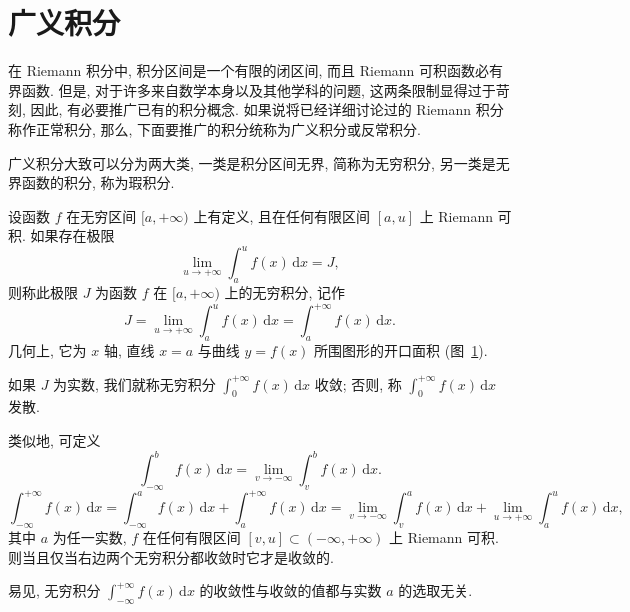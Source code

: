 \section{广义积分}\label{sec:6.5}

在 Riemann 积分中, 积分区间是一个有限的闭区间, 而且 Riemann 可积函数必有界函数. 但是, 对于许多来自数学本身以及其他学科的问题, 这两条限制显得过于苛刻, 因此, 有必要推广已有的积分概念. 如果说将已经详细讨论过的 Riemann 积分称作正常积分, 那么, 下面要推广的积分统称为广义积分或反常积分.

广义积分大致可以分为两大类, 一类是积分区间无界, 简称为无穷积分, 另一类是无界函数的积分, 称为瑕积分.

\begin{definition}\label{def:6.5.1}
设函数 $f$ 在无穷区间 $[a,+\infty)$ 上有定义, 且在任何有限区间 $[a,u]$ 上 Riemann 可积. 如果存在极限
\[
\lim_{u\to+\infty}\int_{a}^{u}f(x)\,\mathrm{d}x=J,
\]
则称此极限 $J$ 为函数 $f$ 在 $[a,+\infty)$ 上的无穷积分, 记作
\[
J=\lim_{u\to+\infty}\int_{a}^{u}f(x)\,\mathrm{d}x=\int_{a}^{+\infty}f(x)\,\mathrm{d}x.
\]
几何上, 它为 $x$ 轴, 直线 $x=a$ 与曲线 $y=f(x)$ 所围图形的开口面积 (图~\ref{fig:6.5.1}).

如果 $J$ 为实数, 我们就称无穷积分 $\int_{0}^{+\infty}f(x)\,\mathrm{d}x$ 收敛; 否则, 称 $\int_{0}^{+\infty}f(x)\,\mathrm{d}x$ 发散.

类似地, 可定义
\[
\int_{-\infty}^{b}f(x)\,\mathrm{d}x=\lim_{v\to-\infty}\int_{v}^{b}f(x)\,\mathrm{d}x.
\]
\[
\int_{-\infty}^{+\infty}f(x)\,\mathrm{d}x=\int_{-\infty}^{a}f(x)\,\mathrm{d}x+\int_{a}^{+\infty}f(x)\,\mathrm{d}x=\lim_{v\to-\infty}\int_{v}^{a}f(x)\,\mathrm{d}x+\lim_{u\to+\infty}\int_{a}^{u}f(x)\,\mathrm{d}x,
\]
其中 $a$ 为任一实数, $f$ 在任何有限区间 $[v,u]\subset(-\infty,+\infty)$ 上 Riemann 可积. 则当且仅当右边两个无穷积分都收敛时它才是收敛的.

易见, 无穷积分 $\int_{-\infty}^{+\infty}f(x)\,\mathrm{d}x$ 的收敛性与收敛的值都与实数 $a$ 的选取无关.
\end{definition}

\begin{figure}[htbp]
\centering
{}
\caption{}\label{fig:6.5.1}
\end{figure}

